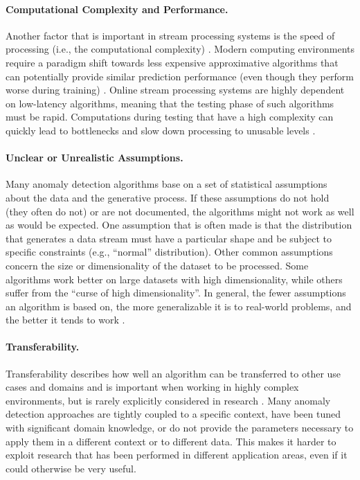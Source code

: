 \paragraph{Computational Complexity and Performance.}
Another factor that is important in stream processing systems is the speed of processing (i.e., the computational complexity) \citep{ahmad_unsupervised_2017}. Modern computing environments require a paradigm shift towards less expensive approximative algorithms that can potentially provide similar prediction performance (even though they perform worse during training) \citep{hayes_contextual_2015}. Online stream processing systems are highly dependent on low-latency algorithms, meaning that the testing phase of such algorithms must be rapid. Computations during testing that have a high complexity can quickly lead to bottlenecks and slow down processing to unusable levels \citep{ahmad_unsupervised_2017}.

\paragraph{Unclear or Unrealistic Assumptions.}
Many anomaly detection algorithms base on a set of statistical assumptions about the data and the generative process. If these assumptions do not hold (they often do not) or are not documented, the algorithms might not work as well as would be expected. One assumption that is often made is that the distribution that generates a data stream must have a particular shape and be subject to specific constraints (e.g., ``normal'' distribution). Other common assumptions concern the size or dimensionality of the dataset to be processed. Some algorithms work better on large datasets with high dimensionality, while others suffer from the ``curse of high dimensionality''. In general, the fewer assumptions an algorithm is based on, the more generalizable it is to real-world problems, and the better it tends to work \citep{ahmad_unsupervised_2017}.

\paragraph{Transferability.}
Transferability describes how well an algorithm can be transferred to other use cases and domains and is important when working in highly complex environments, but is rarely explicitly considered in research \citep{kanarachos_detecting_2017}. Many anomaly detection approaches are tightly coupled to a specific context, have been tuned with significant domain knowledge, or do not provide the parameters necessary to apply them in a different context or to different data. This makes it harder to exploit research that has been performed in different application areas, even if it could otherwise be very useful.

